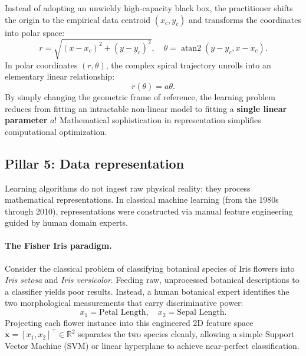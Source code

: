 Instead of adopting an unwieldy high-capacity black box, the practitioner shifts the origin to the empirical data centroid $(x_c, y_c)$ and transforms the coordinates into polar space:
\begin{equation}
r = \sqrt{(x - x_c)^2 + (y - y_c)^2}, \quad \theta = \operatorname{atan2}(y - y_c, x - x_c).
\label{eq:polar_transformation}
\end{equation}
In polar coordinates $(r, \theta)$, the complex spiral trajectory unrolls into an elementary linear relationship:
\begin{equation}
r(\theta) = a \theta.
\label{eq:linear_polar_spiral}
\end{equation}
By simply changing the geometric frame of reference, the learning problem reduces from fitting an intractable non-linear model to fitting a \textbf{single linear parameter} $a$! Mathematical sophistication in representation simplifies computational optimization.

\subsection{Pillar 5: Data representation}
\label{sec:pillar_5_representation}

Learning algorithms do not ingest raw physical reality; they process mathematical representations. In classical machine learning (from the 1980s through 2010), representations were constructed via manual feature engineering guided by human domain experts.

\paragraph{The Fisher Iris paradigm.}
Consider the classical problem of classifying botanical species of Iris flowers into \emph{Iris setosa} and \emph{Iris versicolor}. Feeding raw, unprocessed botanical descriptions to a classifier yields poor results. Instead, a human botanical expert identifies the two morphological measurements that carry discriminative power:
\begin{equation}
x_1 = \text{Petal Length}, \quad x_2 = \text{Sepal Length}.
\end{equation}
Projecting each flower instance into this engineered 2D feature space $\mathbf{x} = [x_1, x_2]^\top \in \mathbb{R}^2$ separates the two species cleanly, allowing a simple Support Vector Machine (SVM) or linear hyperplane to achieve near-perfect classification.

